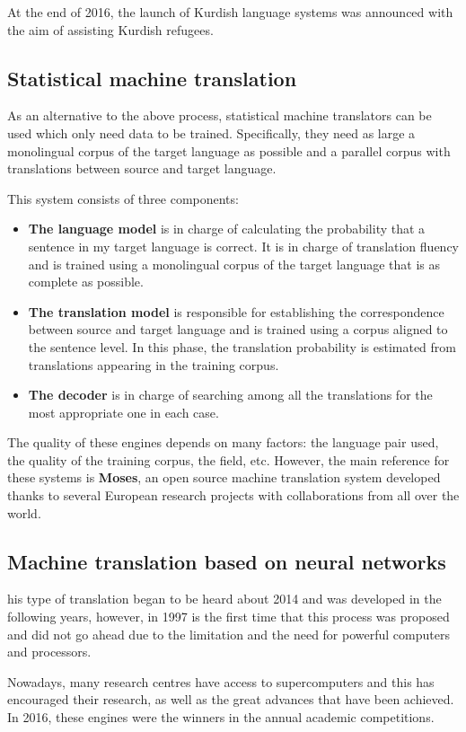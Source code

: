 \documentclass[a4paper]{article}
\theoremstyle{plain}
\theoremstyle{definition}
\begin{document}
    At the end of 2016, the launch of Kurdish language systems was announced with the aim of assisting Kurdish refugees.

    \subsection{Statistical machine translation}
	As an alternative to the above process, statistical machine translators can be used which only need data to be trained. Specifically, they need as large a monolingual corpus of the target language as possible and a parallel corpus with translations between source and target language.

    This system consists of three components: 
    \begin{itemize}
        \item \textbf{The language model} is in charge of calculating the probability that a sentence in my target language is correct. It is in charge of translation fluency and is trained using a monolingual corpus of the target language that is as complete as possible.
         \item \textbf{The translation model} is responsible for establishing the correspondence between source and target language and is trained using a corpus aligned to the sentence level. In this phase, the translation probability is estimated from translations appearing in the training corpus.
         \item \textbf{The decoder} is in charge of searching among all the translations for the most appropriate one in each case.
    \end{itemize}
    The quality of these engines depends on many factors: the language pair used, the quality of the training corpus, the field, etc. However, the main reference for these systems is \textbf{Moses}, an open source machine translation system developed thanks to several European research projects with collaborations from all over the world.
	
	\subsection{Machine translation based on neural networks}
	his type of translation began to be heard about 2014 and was developed in the following years, however, in 1997 is the first time that this process was proposed and did not go ahead due to the limitation and the need for powerful computers and processors.

    Nowadays, many research centres have access to supercomputers and this has encouraged their research, as well as the great advances that have been achieved. In 2016, these engines were the winners in the annual academic competitions.
\end{document}
